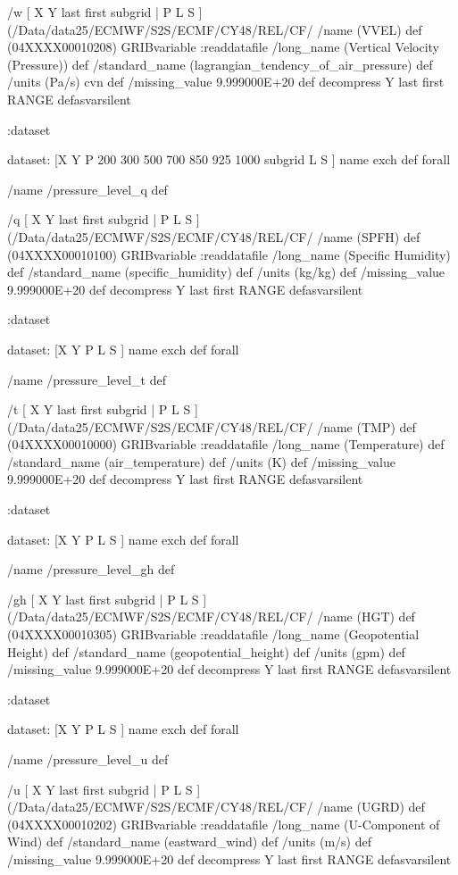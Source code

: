 \begin{ingrid}
/w { [ X Y last first subgrid | P L S ] (/Data/data25/ECMWF/S2S/ECMF/CY48/REL/CF/%
/name (VVEL) def
(04XXXX00010208) GRIBvariable
:readdatafile
/long_name (Vertical Velocity (Pressure)) def
/standard_name (lagrangian_tendency_of_air_pressure) def
/units (Pa/s) cvn def
/missing_value 9.999000E+20 def
decompress
Y last first RANGE
} defasvarsilent

:dataset

dataset:
[X Y P 200 300 500 700 850 925 1000 subgrid L S ] {name exch def } forall

/name /pressure_level_q def

/q { [ X Y last first subgrid | P L S ] (/Data/data25/ECMWF/S2S/ECMF/CY48/REL/CF/%
/name (SPFH) def
(04XXXX00010100) GRIBvariable
:readdatafile
/long_name (Specific Humidity) def
/standard_name (specific_humidity) def
/units (kg/kg) def
/missing_value 9.999000E+20 def
decompress
Y last first RANGE
} defasvarsilent

:dataset

dataset:
[X Y P L S ] {name exch def } forall

/name /pressure_level_t def

/t { [ X Y last first subgrid | P L S ] (/Data/data25/ECMWF/S2S/ECMF/CY48/REL/CF/%
/name (TMP) def
(04XXXX00010000) GRIBvariable
:readdatafile
/long_name (Temperature) def
/standard_name (air_temperature) def
/units (K) def
/missing_value 9.999000E+20 def
decompress
Y last first RANGE
} defasvarsilent

:dataset

dataset:
[X Y P L S ] {name exch def } forall

/name /pressure_level_gh def

/gh { [ X Y last first subgrid | P L S ] (/Data/data25/ECMWF/S2S/ECMF/CY48/REL/CF/%
/name (HGT) def
(04XXXX00010305) GRIBvariable
:readdatafile
/long_name (Geopotential Height) def
/standard_name (geopotential_height) def
/units (gpm) def
/missing_value 9.999000E+20 def
decompress
Y last first RANGE
} defasvarsilent

:dataset

dataset:
[X Y P L S ] {name exch def } forall

/name /pressure_level_u def

/u { [ X Y last first subgrid | P L S ] (/Data/data25/ECMWF/S2S/ECMF/CY48/REL/CF/%
/name (UGRD) def
(04XXXX00010202) GRIBvariable
:readdatafile
/long_name (U-Component of Wind) def
/standard_name (eastward_wind) def
/units (m/s) def
/missing_value 9.999000E+20 def
decompress
Y last first RANGE
} defasvarsilent


\end{ingrid}
